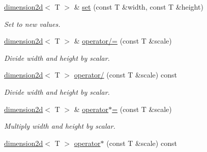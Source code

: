 \begin{DoxyCompactItemize}
\item 
\hyperlink{classirr_1_1core_1_1dimension2d}{dimension2d}$<$ T $>$ \& \hyperlink{classirr_1_1core_1_1dimension2d_a81860d7ff5a888a37af84f7bbbad7c91}{set} (const T \&width, const T \&height)\hypertarget{classirr_1_1core_1_1dimension2d_a81860d7ff5a888a37af84f7bbbad7c91}{}\label{classirr_1_1core_1_1dimension2d_a81860d7ff5a888a37af84f7bbbad7c91}

\begin{DoxyCompactList}\small\item\em Set to new values. \end{DoxyCompactList}\item 
\hyperlink{classirr_1_1core_1_1dimension2d}{dimension2d}$<$ T $>$ \& \hyperlink{classirr_1_1core_1_1dimension2d_ac581fbe07dabf2a342314c7a73f862c8}{operator/=} (const T \&scale)\hypertarget{classirr_1_1core_1_1dimension2d_ac581fbe07dabf2a342314c7a73f862c8}{}\label{classirr_1_1core_1_1dimension2d_ac581fbe07dabf2a342314c7a73f862c8}

\begin{DoxyCompactList}\small\item\em Divide width and height by scalar. \end{DoxyCompactList}\item 
\hyperlink{classirr_1_1core_1_1dimension2d}{dimension2d}$<$ T $>$ \hyperlink{classirr_1_1core_1_1dimension2d_ab5539b955741b270081559f82c413b70}{operator/} (const T \&scale) const \hypertarget{classirr_1_1core_1_1dimension2d_ab5539b955741b270081559f82c413b70}{}\label{classirr_1_1core_1_1dimension2d_ab5539b955741b270081559f82c413b70}

\begin{DoxyCompactList}\small\item\em Divide width and height by scalar. \end{DoxyCompactList}\item 
\hyperlink{classirr_1_1core_1_1dimension2d}{dimension2d}$<$ T $>$ \& \hyperlink{classirr_1_1core_1_1dimension2d_acd311b8270b3c95791edf9a5b2869b1b}{operator$\ast$=} (const T \&scale)\hypertarget{classirr_1_1core_1_1dimension2d_acd311b8270b3c95791edf9a5b2869b1b}{}\label{classirr_1_1core_1_1dimension2d_acd311b8270b3c95791edf9a5b2869b1b}

\begin{DoxyCompactList}\small\item\em Multiply width and height by scalar. \end{DoxyCompactList}\item 
\hyperlink{classirr_1_1core_1_1dimension2d}{dimension2d}$<$ T $>$ \hyperlink{classirr_1_1core_1_1dimension2d_a2e4febe786961e1fb3f0c1d61d65cc58}{operator$\ast$} (const T \&scale) const \hypertarget{classirr_1_1core_1_1dimension2d_a2e4febe786961e1fb3f0c1d61d65cc58}{}\label{classirr_1_1core_1_1dimension2d_a2e4febe786961e1fb3f0c1d61d65cc58}


\end{DoxyCompactItemize}
